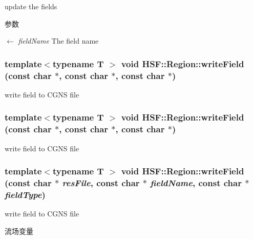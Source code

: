 update the fields 
\begin{DoxyParams}{参数}
\item[\mbox{$\leftarrow$} {\em fieldName}]The field name \end{DoxyParams}
\hypertarget{classHSF_1_1Region_a2298d4a70a05cfef042c077410c3c29b}{
\subsubsection[{writeField}]{\setlength{\rightskip}{0pt plus 5cm}template$<$typename T $>$ void HSF::Region::writeField (const char $\ast$, \/  const char $\ast$, \/  const char $\ast$)}}
\label{classHSF_1_1Region_a2298d4a70a05cfef042c077410c3c29b}


write field to CGNS file \hypertarget{classHSF_1_1Region_a2298d4a70a05cfef042c077410c3c29b}{
\subsubsection[{writeField}]{\setlength{\rightskip}{0pt plus 5cm}template$<$typename T $>$ void HSF::Region::writeField (const char $\ast$, \/  const char $\ast$, \/  const char $\ast$)}}
\label{classHSF_1_1Region_a2298d4a70a05cfef042c077410c3c29b}


write field to CGNS file \hypertarget{classHSF_1_1Region_a2298d4a70a05cfef042c077410c3c29b}{
\subsubsection[{writeField}]{\setlength{\rightskip}{0pt plus 5cm}template$<$typename T $>$ void HSF::Region::writeField (const char $\ast$ {\em resFile}, \/  const char $\ast$ {\em fieldName}, \/  const char $\ast$ {\em fieldType})}}
\label{classHSF_1_1Region_a2298d4a70a05cfef042c077410c3c29b}


write field to CGNS file 

流场变量

